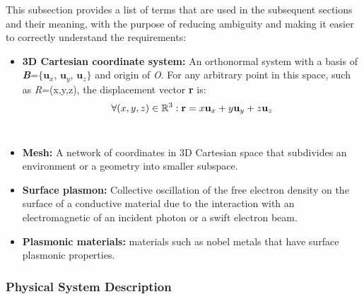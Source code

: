 \documentclass[12pt]{article}
\begin{document}
This subsection provides a list of terms that are used in the subsequent
sections and their meaning, with the purpose of reducing ambiguity and making it
easier to correctly understand the requirements:

\begin{itemize} 
\item \textbf{3D Cartesian coordinate system:} An orthonormal system with a basis of \textbf{\textit{B}}=$\{$$\textbf{u}_x$, $\textbf{u}_y$, $\textbf{u}_z$$\}$ and origin of \textit{O}. For any arbitrary point in this space, such as \textit{R}=(x,y,z), the displacement vector \textbf{r} is: \\

\begin{equation}
	\label{eq:planewave}
	\forall (x, y, z) \in \Bbb R^3: \textbf{r}= x\textbf{u}_x + y\textbf{u}_y +z\textbf{u}_z
	\end{equation} \\

\item \textbf{Mesh:} A network of coordinates in 3D Cartesian space that subdivides an environment or a geometry into smaller subspace.   
\item \textbf{Surface plasmon:} Collective oscillation of the free electron density on the surface of a conductive material due to the interaction with an electromagnetic of an incident photon or a swift electron beam.     
\item \textbf{Plasmonic materials:} materials such as nobel metals that have surface plasmonic properties.


\end{itemize}


\subsubsection{Physical System Description} \label{sec_phySystDescrip}

\end{document}
